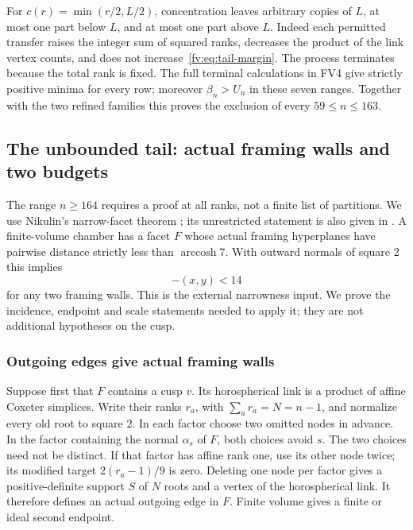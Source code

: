 \documentclass[11pt]{article}
\theoremstyle{remark}\newtheorem{remark}[theorem]{Remark}
\numberwithin{equation}{section}
\begin{document}
For $c(r)=\min(r/2,L/2)$, concentration leaves arbitrary copies
of $L$, at most one part below $L$, and at most one part above $L$.
Indeed each permitted transfer raises the integer sum of squared
ranks, decreases the product of the link vertex counts, and does
not increase~\eqref{fv:eq:tail-margin}. The process terminates
because the total rank is fixed. The full terminal calculations
in FV4 give strictly positive minima for every row; moreover
$\beta_n>U_n$ in these seven ranges. Together with the two refined
families this proves the exclusion of every $59\le n\le163$.

\subsection{The unbounded tail: actual framing walls and two budgets}
\label{fv:app:narrow-tail}

The range $n\ge164$ requires a proof at all ranks, not a finite list
of partitions. We use Nikulin's narrow-facet theorem
\cite[pp.~654--655]{Nikulin}; its unrestricted statement is also given
in \cite[Section~4, p.~10]{NikulinNarrow}. A finite-volume chamber has a facet $F$
whose actual framing hyperplanes have pairwise distance strictly
less than $\operatorname{arccosh}7$. With outward normals of square 2
this implies
 \begin{equation}\label{fv:eq:narrow}
 -(x,y)<14
\end{equation}
for any two framing walls. This is the external narrowness input.
We prove the incidence, endpoint and scale statements needed to
apply it; they are not additional hypotheses on the cusp.

\subsubsection{Outgoing edges give actual framing walls}

Suppose first that $F$ contains a cusp $v$. Its horospherical link is
a product of affine Coxeter simplices. Write their ranks $r_a$,
with $\sum_ar_a=N=n-1$, and normalize every old root to square 2.
In each factor choose two omitted nodes in advance. In the factor
containing the normal $\alpha_s$ of $F$, both choices avoid $s$.
The two choices need not be distinct. If that factor has affine rank
one, use its other node twice; its modified target $2(r_a-1)/9$ is zero.
Deleting one node per factor gives a positive-definite support $S$
of $N$ roots and a vertex of the horospherical link. It therefore
defines an actual outgoing edge in $F$. Finite volume gives a
finite or ideal second endpoint.
\end{document}
